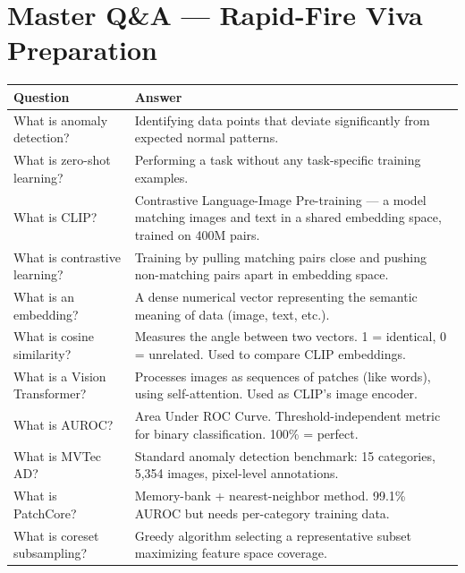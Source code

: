 \documentclass[12pt, a4paper]{article}
\begin{document}

\section{Master Q\&A --- Rapid-Fire Viva Preparation}

\begin{longtable}{@{}p{5.5cm}p{9.5cm}@{}}
\toprule
\textbf{Question} & \textbf{Answer} \\
\midrule
\endhead
What is anomaly detection? & Identifying data points that deviate significantly from expected normal patterns. \\
\addlinespace
What is zero-shot learning? & Performing a task without any task-specific training examples. \\
\addlinespace
What is CLIP? & Contrastive Language-Image Pre-training --- a model matching images and text in a shared embedding space, trained on 400M pairs. \\
\addlinespace
What is contrastive learning? & Training by pulling matching pairs close and pushing non-matching pairs apart in embedding space. \\
\addlinespace
What is an embedding? & A dense numerical vector representing the semantic meaning of data (image, text, etc.). \\
\addlinespace
What is cosine similarity? & Measures the angle between two vectors. 1 = identical, 0 = unrelated. Used to compare CLIP embeddings. \\
\addlinespace
What is a Vision Transformer? & Processes images as sequences of patches (like words), using self-attention. Used as CLIP's image encoder. \\
\addlinespace
What is AUROC? & Area Under ROC Curve. Threshold-independent metric for binary classification. 100\% = perfect. \\
\addlinespace
What is MVTec AD? & Standard anomaly detection benchmark: 15 categories, 5,354 images, pixel-level annotations. \\
\addlinespace
What is PatchCore? & Memory-bank + nearest-neighbor method. 99.1\% AUROC but needs per-category training data. \\
\addlinespace
What is coreset subsampling? & Greedy algorithm selecting a representative subset maximizing feature space coverage. \\

\end{longtable}
\end{document}

